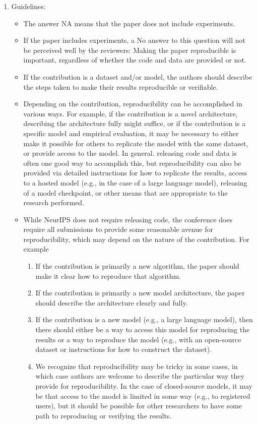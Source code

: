 \documentclass{article}
\begin{document}
\begin{enumerate}
    \item[] Guidelines:
    \begin{itemize}
        \item The answer NA means that the paper does not include experiments.
        \item If the paper includes experiments, a No answer to this question will not be perceived well by the reviewers: Making the paper reproducible is important, regardless of whether the code and data are provided or not.
        \item If the contribution is a dataset and/or model, the authors should describe the steps taken to make their results reproducible or verifiable. 
        \item Depending on the contribution, reproducibility can be accomplished in various ways. For example, if the contribution is a novel architecture, describing the architecture fully might suffice, or if the contribution is a specific model and empirical evaluation, it may be necessary to either make it possible for others to replicate the model with the same dataset, or provide access to the model. In general. releasing code and data is often one good way to accomplish this, but reproducibility can also be provided via detailed instructions for how to replicate the results, access to a hosted model (e.g., in the case of a large language model), releasing of a model checkpoint, or other means that are appropriate to the research performed.
        \item While NeurIPS does not require releasing code, the conference does require all submissions to provide some reasonable avenue for reproducibility, which may depend on the nature of the contribution. For example
        \begin{enumerate}
            \item If the contribution is primarily a new algorithm, the paper should make it clear how to reproduce that algorithm.
            \item If the contribution is primarily a new model architecture, the paper should describe the architecture clearly and fully.
            \item If the contribution is a new model (e.g., a large language model), then there should either be a way to access this model for reproducing the results or a way to reproduce the model (e.g., with an open-source dataset or instructions for how to construct the dataset).
            \item We recognize that reproducibility may be tricky in some cases, in which case authors are welcome to describe the particular way they provide for reproducibility. In the case of closed-source models, it may be that access to the model is limited in some way (e.g., to registered users), but it should be possible for other researchers to have some path to reproducing or verifying the results.
        \end{enumerate}
    \end{itemize}



\end{enumerate}
\end{document}
